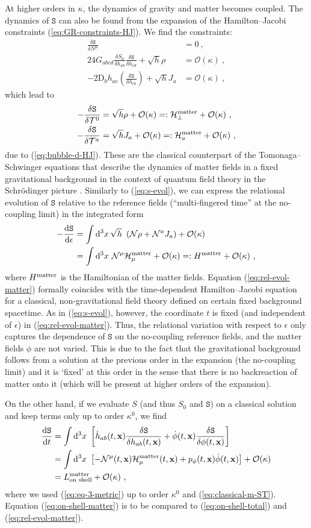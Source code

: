 \documentclass[12pt]{iopart}
\def\eq#1{\begin{equation}\begin{aligned}#1\end{aligned}\end{equation}}
\def\eref#1{(\ref{eq:#1})}
\def\D{\mathrm{d}}
\def\Del#1#2{\frac{\D#1}{\D#2}}
\def\S{\mathtt{S}}
\def\Ob{\mathcal{O}}
\def\N{\mathcal{N}}
\def\x{\mathbf{x}}
\def\T{\mathcal{T}}
\begin{document}
At higher orders in $\kappa$, the dynamics of gravity and matter becomes coupled. The dynamics of $\S$ can also be found from the expansion of the Hamilton--Jacobi constraints \eref{GR-constraints-HJ}. We find the constraints:
\eq{\label{eq:Stt-HJ}
\frac{\delta\S}{\delta N^{\mu}} &= 0 \ , \\
24G_{abcd}\frac{\delta S_0}{\delta h_{ab}}\frac{\delta \S}{\delta h_{cd}}+\sqrt{h}\rho &= \Ob(\kappa) \ ,\\
-2\mathrm{D}_b h_{ac}\left(\frac{\delta \S}{\delta h_{cb}}\right)+\sqrt{h}J_a &= \Ob(\kappa) \ ,
}
which lead to
\eq{\label{eq:classical-m-ST}
-\frac{\delta\S}{\delta\T^0} &= \sqrt{h}\rho+\Ob(\kappa) =: \mathcal{H}_{\perp}^{\rm matter}+\Ob(\kappa) \ ,\\
-\frac{\delta\S}{\delta\T^{a}} &=\sqrt{h}J_a+\Ob(\kappa)=: \mathcal{H}_{a}^{\rm matter} +\Ob(\kappa) \ ,
}
due to \eref{bubble-d-HJ}. These are the classical counterpart of the Tomonaga--Schwinger equations that describe the dynamics of matter fields in a fixed gravitational background in the context of quantum field theory in the Schr\"odinger picture \citep{Tomonaga:1946zz,Schwinger:1948yk,Jackiw:1995be,Torre:1998eq}. Similarly to \eref{s-evol}, we can express the relational evolution of $\S$ relative to the reference fields (``multi-fingered time'' at the no-coupling limit) in the integrated form
\eq{\label{eq:rel-evol-matter}
-\Del{\S}{\epsilon} &= \int\D^3x\,\sqrt{h}\ \left(\N\rho+\N^aJ_a\right)+\Ob(\kappa)\\
& = \int\D^3x\ \N^{\mu}\mathcal{H}^{\rm matter}_{\mu}+\Ob(\kappa) =: H^{\rm matter}+\Ob(\kappa) \ ,
}
where $H^{\rm matter}$ is the Hamiltonian of the matter fields. Equation \eref{rel-evol-matter} formally coincides with the time-dependent Hamilton--Jacobi equation for a classical, non-gravitational field theory defined on certain fixed background spacetime. As in \eref{s-evol}, however, the coordinate $t$ is fixed (and independent of $\epsilon$) in \eref{rel-evol-matter}. Thus, the relational variation with respect to $\epsilon$ only captures the dependence of $\S$ on the no-coupling reference fields, and the matter fields $\phi$ are not varied. This is due to the fact that the gravitational background follows from a solution at the previous order in the expansion (the no-coupling limit) and it is `fixed' at this order in the sense that there is no backreaction of matter onto it (which will be present at higher orders of the expansion).

On the other hand, if we evaluate $S$ (and thus $S_0$ and $\S$) on a classical solution and keep terms only up to order $\kappa^0$, we find
\eq{\label{eq:on-shell-matter}
\Del{\S}{t} &= \int\D^3x\ \left[\dot{h}_{ab}(t,\x)\frac{\delta \S}{\delta h_{ab}(t,\x)} +\dot{\phi}(t,\x)\frac{\delta \S}{\delta\phi(t,\x)}\right]\\
&= \int\D^3x\ \left[-\N^{\mu}(t,\x)\mathcal{H}^{\rm matter}_{\mu}(t,\x) + p_\phi(t,\x)\dot{\phi}(t,\x)\right]+\Ob(\kappa)\\
&= L_{\text{on shell}}^{\text{matter}} +\Ob(\kappa) \ ,
}
where we used \eref{eq-3-metric} up to order $\kappa^0$ and \eref{classical-m-ST}. Equation \eref{on-shell-matter} is to be compared to \eref{on-shell-total} and \eref{rel-evol-matter}.
\end{document}
